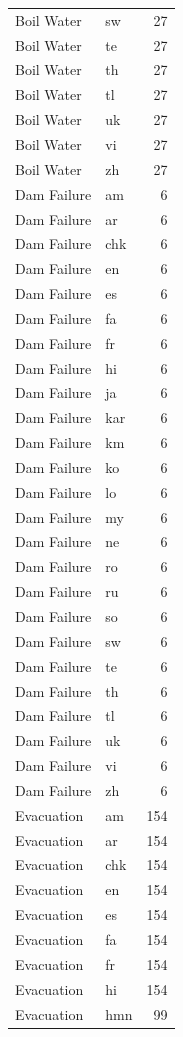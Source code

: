 \begin{longtable}{p{3cm} p{3cm} r}
Boil Water & sw & 27 \\
Boil Water & te & 27 \\
Boil Water & th & 27 \\
Boil Water & tl & 27 \\
Boil Water & uk & 27 \\
Boil Water & vi & 27 \\
Boil Water & zh & 27 \\
Dam Failure & am & 6 \\
Dam Failure & ar & 6 \\
Dam Failure & chk & 6 \\
Dam Failure & en & 6 \\
Dam Failure & es & 6 \\
Dam Failure & fa & 6 \\
Dam Failure & fr & 6 \\
Dam Failure & hi & 6 \\
Dam Failure & ja & 6 \\
Dam Failure & kar & 6 \\
Dam Failure & km & 6 \\
Dam Failure & ko & 6 \\
Dam Failure & lo & 6 \\
Dam Failure & my & 6 \\
Dam Failure & ne & 6 \\
Dam Failure & ro & 6 \\
Dam Failure & ru & 6 \\
Dam Failure & so & 6 \\
Dam Failure & sw & 6 \\
Dam Failure & te & 6 \\
Dam Failure & th & 6 \\
Dam Failure & tl & 6 \\
Dam Failure & uk & 6 \\
Dam Failure & vi & 6 \\
Dam Failure & zh & 6 \\
Evacuation & am & 154 \\
Evacuation & ar & 154 \\
Evacuation & chk & 154 \\
Evacuation & en & 154 \\
Evacuation & es & 154 \\
Evacuation & fa & 154 \\
Evacuation & fr & 154 \\
Evacuation & hi & 154 \\
Evacuation & hmn & 99 \\

\end{longtable}
